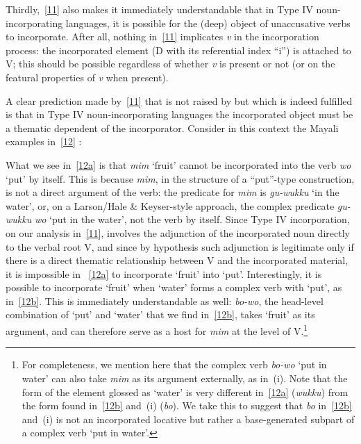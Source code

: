 \documentclass[output=paper]{langsci/langscibook}
\begin{document}
\begin{refcontext}
Thirdly,~\eqref{11} also makes it immediately understandable that in Type IV
noun-incorporating languages, it is possible for the (deep) object of
unaccusative verbs to incorporate. After all, nothing in~\eqref{11} implicates
\emph{v} in the incorporation process: the incorporated element (D with its
referential index \enquote{i}) is attached to V; this should be possible regardless
of whether \emph{v} is present or not (or on the featural properties of
\emph{v} when present).

A clear prediction made by~\eqref{11} that is not raised by \citet{bakeretal05}
but which is indeed fulfilled is that in Type IV noun-incorporating languages
the incorporated object must be a thematic dependent of the incorporator.
Consider in this context the Mayali examples in~\eqref{12} \citep{evans94}:

\ea \label{12}
    \z
\z
What we see in~\eqref{12a} is that \emph{mim} \enquote*{fruit} cannot be incorporated into the
verb \emph{wo} \enquote*{put} by itself. This is because \emph{mim}, in the structure
of a \enquote{put}-type construction, is not a direct argument of the verb: the
predicate for \emph{mim} is \emph{gu-wukku} \enquote*{in the water}, or, on a
Larson/Hale \&{} Keyser-style approach, the complex predicate \emph{gu-wukku}
\emph{wo} \enquote*{put in the water}, not the verb by itself. Since Type IV
incorporation, on our analysis in~\eqref{11}, involves the adjunction of the
incorporated noun directly to the verbal root V, and since by hypothesis such
adjunction is legitimate only if there is a direct thematic relationship
between V and the incorporated material, it is impossible in ~\eqref{12a}
to incorporate \enquote*{fruit} into \enquote*{put}. Interestingly, it is possible to
incorporate \enquote*{fruit} when \enquote*{water} forms a complex verb with \enquote*{put}, as
in~\eqref{12b}. This is immediately understandable as well: \emph{bo-wo}, the
head-level combination of \enquote*{put} and \enquote*{water} that we find
in~\eqref{12b}, takes \enquote*{fruit} as its argument, and can therefore serve
as a host for \emph{mim} at the level of V.\footnote{For completeness, we
    mention here that the complex verb \emph{bo-wo} \enquote*{put in water} can
    also take \emph{mim} as its argument externally, as in~(i). Note that the
    form of the element glossed as \enquote*{water} is very different
    in~\eqref{12a} (\emph{wukku}) from the form found in~\eqref{12b} and~(i)
    (\emph{bo}). We take this to suggest that \emph{bo} in~\eqref{12b} and~(i)
    is not an incorporated locative but rather a base-generated subpart of a
    complex verb \enquote*{put in water}.

}
\end{refcontext}
\end{document}
